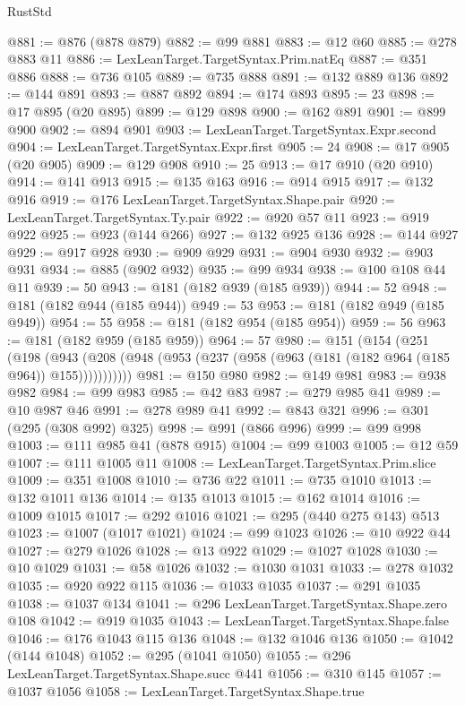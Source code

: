 \begin{lexlean}{RustStd}
\begin{coremodule}
@881 := @876 (@878 @879)
@882 := @99 @881
@883 := @12 @60
@885 := @278 @883 @11
@886 := LexLeanTarget.TargetSyntax.Prim.natEq
@887 := @351 @886
@888 := @736 @105
@889 := @735 @888
@891 := @132 @889 @136
@892 := @144 @891
@893 := @887 @892
@894 := @174 @893
@895 := 23
@898 := @17 @895 (@20 @895)
@899 := @129 @898
@900 := @162 @891
@901 := @899 @900
@902 := @894 @901
@903 := LexLeanTarget.TargetSyntax.Expr.second
@904 := LexLeanTarget.TargetSyntax.Expr.first
@905 := 24
@908 := @17 @905 (@20 @905)
@909 := @129 @908
@910 := 25
@913 := @17 @910 (@20 @910)
@914 := @141 @913
@915 := @135 @163
@916 := @914 @915
@917 := @132 @916
@919 := @176 LexLeanTarget.TargetSyntax.Shape.pair
@920 := LexLeanTarget.TargetSyntax.Ty.pair
@922 := @920 @57 @11
@923 := @919 @922
@925 := @923 (@144 @266)
@927 := @132 @925 @136
@928 := @144 @927
@929 := @917 @928
@930 := @909 @929
@931 := @904 @930
@932 := @903 @931
@934 := @885 (@902 @932)
@935 := @99 @934
@938 := @100 @108 @44 @11
@939 := 50
@943 := @181 (@182 @939 (@185 @939))
@944 := 52
@948 := @181 (@182 @944 (@185 @944))
@949 := 53
@953 := @181 (@182 @949 (@185 @949))
@954 := 55
@958 := @181 (@182 @954 (@185 @954))
@959 := 56
@963 := @181 (@182 @959 (@185 @959))
@964 := 57
@980 := @151
    (@154
      (@251
        (@198
          (@943 (@208 (@948 (@953 (@237 (@958 (@963 (@181 (@182 @964 (@185 @964)) @155)))))))))))
@981 := @150 @980
@982 := @149 @981
@983 := @938 @982
@984 := @99 @983
@985 := @42 @83
@987 := @279 @985 @41
@989 := @10 @987 @46
@991 := @278 @989 @41
@992 := @843 @321
@996 := @301 (@295 (@308 @992) @325)
@998 := @991 (@866 @996)
@999 := @99 @998
@1003 := @111 @985 @41 (@878 @915)
@1004 := @99 @1003
@1005 := @12 @59
@1007 := @111 @1005 @11
@1008 := LexLeanTarget.TargetSyntax.Prim.slice
@1009 := @351 @1008
@1010 := @736 @22
@1011 := @735 @1010
@1013 := @132 @1011 @136
@1014 := @135 @1013
@1015 := @162 @1014
@1016 := @1009 @1015
@1017 := @292 @1016
@1021 := @295 (@440 @275 @143) @513
@1023 := @1007 (@1017 @1021)
@1024 := @99 @1023
@1026 := @10 @922 @44
@1027 := @279 @1026
@1028 := @13 @922
@1029 := @1027 @1028
@1030 := @10 @1029
@1031 := @58 @1026
@1032 := @1030 @1031
@1033 := @278 @1032
@1035 := @920 @922 @115
@1036 := @1033 @1035
@1037 := @291 @1035
@1038 := @1037 @134
@1041 := @296 LexLeanTarget.TargetSyntax.Shape.zero @108
@1042 := @919 @1035
@1043 := LexLeanTarget.TargetSyntax.Shape.false
@1046 := @176 @1043 @115 @136
@1048 := @132 @1046 @136
@1050 := @1042 (@144 @1048)
@1052 := @295 (@1041 @1050)
@1055 := @296 LexLeanTarget.TargetSyntax.Shape.succ @441
@1056 := @310 @145
@1057 := @1037 @1056
@1058 := LexLeanTarget.TargetSyntax.Shape.true

\end{coremodule}
\end{lexlean}
